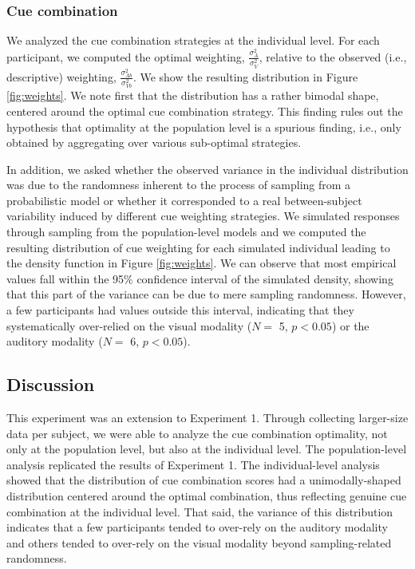 \documentclass[english,,man,floatsintext]{apa6}
\theoremstyle{definition}
\theoremstyle{definition}
\theoremstyle{definition}
\theoremstyle{remark}
\begin{document}
\subsubsection{Cue combination}\label{cue-combination-3}

We analyzed the cue combination strategies at the individual level. For
each participant, we computed the optimal weighting,
\(\frac{\sigma^2_{A}}{\sigma^2_{V}}\), relative to the observed (i.e.,
descriptive) weighting, \(\frac{\sigma^2_{Ab}}{\sigma^2_{Vb}}\). We show
the resulting distribution in Figure \ref{fig:weights}. We note first
that the distribution has a rather bimodal shape, centered around the
optimal cue combination strategy. This finding rules out the hypothesis
that optimality at the population level is a spurious finding, i.e.,
only obtained by aggregating over various sub-optimal strategies.

In addition, we asked whether the observed variance in the individual
distribution was due to the randomness inherent to the process of
sampling from a probabilistic model or whether it corresponded to a real
between-subject variability induced by different cue weighting
strategies. We simulated responses through sampling from the
population-level models and we computed the resulting distribution of
cue weighting for each simulated individual leading to the density
function in Figure \ref{fig:weights}. We can observe that most empirical
values fall within the 95\% confidence interval of the simulated
density, showing that this part of the variance can be due to mere
sampling randomness. However, a few participants had values outside this
interval, indicating that they systematically over-relied on the visual
modality (\(N=\) 5, \(p < 0.05\)) or the auditory modality (\(N=\) 6,
\(p < 0.05\)).

\subsection{Discussion}\label{discussion-3}

This experiment was an extension to Experiment 1. Through collecting
larger-size data per subject, we were able to analyze the cue
combination optimality, not only at the population level, but also at
the individual level. The population-level analysis replicated the
results of Experiment 1. The individual-level analysis showed that the
distribution of cue combination scores had a unimodally-shaped
distribution centered around the optimal combination, thus reflecting
genuine cue combination at the individual level. That said, the variance
of this distribution indicates that a few participants tended to
over-rely on the auditory modality and others tended to over-rely on the
visual modality beyond sampling-related randomness.
\end{document}
